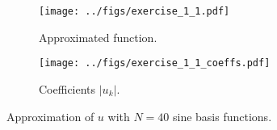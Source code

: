 \begin{solution}
    \begin{figure}[!h]
        \centering
        \begin{subfigure}[b]{0.45\textwidth}
            \texttt{[image: ../figs/exercise\_1\_1.pdf]}
            \caption{Approximated function.\label{fig:1_1_curve}}
        \end{subfigure}
        \hfill
        \begin{subfigure}[b]{0.45\textwidth}
            \texttt{[image: ../figs/exercise\_1\_1\_coeffs.pdf]}
            \caption{Coefficients $|u_k|$.\label{fig:1_1_coeffs}}
        \end{subfigure}
        \caption{Approximation of $u$ with $N = 40$ sine basis functions.\label{fig:1_1}}
    \end{figure}
\end{solution}
